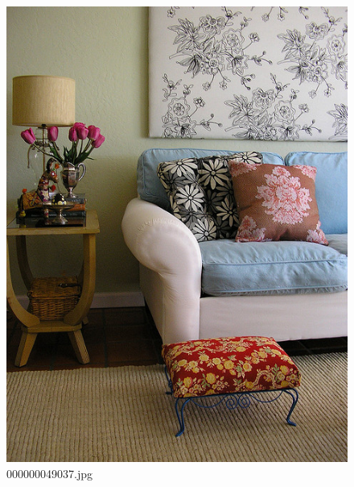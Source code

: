 \begin{figure}[h]
    \centering
    \includegraphics[width=0.8\linewidth]{../image set/hard/000000049037.jpg}
    \caption{000000049037.jpg}
\end{figure}
